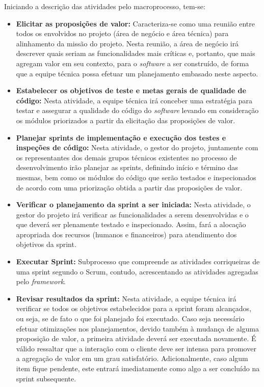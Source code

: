 Iniciando a descrição das atividades pelo macroprocesso, tem-se:

\begin{itemize}
	\item \textbf{Elicitar as proposições de valor:} Caracteriza-se como uma reunião entre todos os envolvidos no projeto (área de negócio e área técnica) para alinhamento da missão do projeto. Nesta reunião, a área de negócio irá descrever quais seriam as funcionalidades mais críticas e, portanto, que mais agregam valor em seu contexto, para o \textit{software} a ser construído, de forma que a equipe técnica possa efetuar um planejamento embasado neste aspecto.

	\item \textbf{Estabelecer os objetivos de teste e metas gerais de qualidade de código:} Nesta atividade, a equipe técnica irá conceber uma estratégia para testar e assegurar a qualidade do código do \textit{software} levando em consideração os módulos priorizados a partir da elicitação das proposições de valor.

	\item \textbf{Planejar sprints de implementação e execução dos testes e inspeções de código:} Nesta atividade, o gestor do projeto, juntamente com os representantes dos demais grupos técnicos existentes no processo de desenvolvimento irão planejar as sprints, definindo início e término das mesmas, bem como os módulos do código que serão testados e inspecionados de acordo com uma priorização obtida a partir das proposições de valor.

	\item \textbf{Verificar o planejamento da sprint a ser iniciada:} Nesta atividade, o gestor do projeto irá verificar as funcionalidades a serem desenvolvidas e o que deverá ser plenamente testado e inspecionado. Assim, fará a alocação apropriada dos recursos (humanos e financeiros) para atendimento dos objetivos da sprint.

	\item \textbf{Executar Sprint:} Subprocesso que compreende as atividades corriqueiras de uma sprint segundo o Scrum, contudo, acrescentando as atividades agregadas pelo \textit{framework}.

	\item \textbf{Revisar resultados da sprint:} Nesta atividade, a equipe técnica irá verificar se todos os objetivos estabelecidos para a sprint foram alcançados, ou seja, se de fato o que foi planejado foi executado. Caso seja necessário efetuar otimizações nos planejamentos, devido também à mudança de alguma proposição de valor, a primeira atividade deverá ser executada novamente. É válido ressaltar que a interação com o cliente deve ser intensa para promover a agregação de valor em um grau satisfatório. Adicionalmente, caso algum item fique pendente, este entrará imediatamente como algo a ser concluído na sprint subsequente.


\end{itemize}
